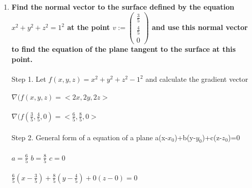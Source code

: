 \documentclass{article}
\begin{document}
\begin{enumerate}[13.]
\item\textbf{Find the normal vector to the surface defined by the equation $x^{2} + y^{2} + z^{2} =1^{2}$ at the point $v := \left(\!\begin{array}{c} \frac{3}{5}\\ \frac{4}{5} \\ 0 \end{array} \!\right)$ and use this normal vector to find the equation of the plane tangent to the surface at this point.}\\
\\
Step 1. Let $f(x,y,z)=x^{2} + y^{2} + z^{2} -1^{2}$ and calculate the gradient vector\\
\\
$\nabla(f(x,y,z)=<2x,2y,2z>$\\
\\
$\nabla(f(\frac{3}{5},\frac{4}{5},0)=<\frac{6}{5},\frac{8}{5},0>$\\
\\
Step 2. General form of a equation of a plane a(x-$x_{0}$)+b(y-$y_{0}$)+c(z-$z_{0}$)=0\\
\\
$a=\frac{6}{5}$ $b=\frac{8}{5}$ $c=0$\\
\\
$\frac{6}{5}(x-\frac{3}{5})+\frac{8}{5}(y-\frac{4}{5})+0(z-0)=0$
\end{enumerate}
\end{document}
